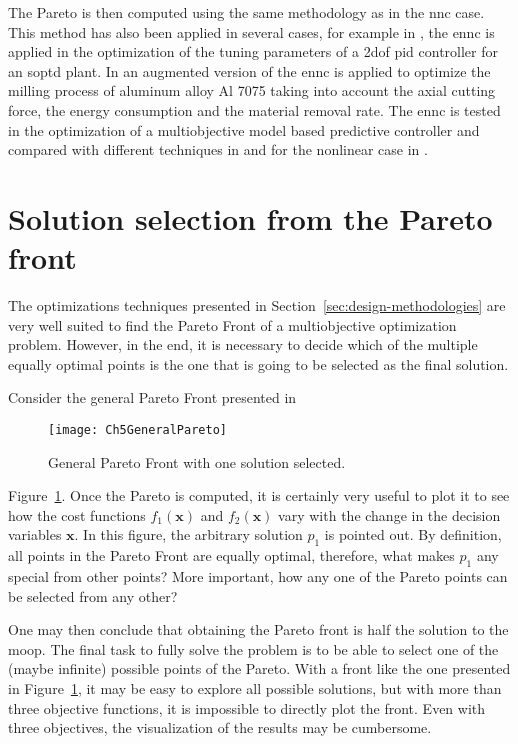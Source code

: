 The Pareto is then computed using the same methodology as in the \gls{nnc} case. This method has also been applied in several cases, for example in \citet{Contreras-Leiva2016}, the \gls{ennc} is applied in the optimization of the tuning parameters of a \gls{2dof} \gls{pid} controller for an \gls{soptd} plant. In \citet{Pereira2017b} an augmented version of the \gls{ennc} is applied to optimize the milling process of aluminum alloy Al 7075 taking into account the axial cutting force, the energy consumption and the material removal rate. The \gls{ennc} is tested in the optimization of a multiobjective model based predictive controller and compared with different techniques in \citet{Toro2011} and for the nonlinear case in \citet{Vallerio2014}.
\section{Solution selection from the Pareto front}
\label{sec:Selection}
The optimizations techniques presented in Section~\ref{sec:design-methodologies} are very well suited to find the Pareto Front of a multiobjective optimization problem. However, in the end, it is necessary to decide which of the multiple equally optimal points is the one that is going to be selected as the final solution.

Consider the general Pareto Front presented in 
\begin{figure}[b]
	\centering
	\texttt{[image: Ch5GeneralPareto]}
	\caption{General Pareto Front with one solution selected.}
	\label{fig:Ch5GeneralPareto}
\end{figure}
%
Figure~\ref{fig:Ch5GeneralPareto}. Once the Pareto is computed, it is certainly very useful to plot it to see how the cost functions $f_1(\mathbf{x})$ and $f_2(\mathbf{x})$ vary with the change in the decision variables $\mathbf{x}$. In this figure, the arbitrary solution $p_1$ is pointed out. By definition, all points in the Pareto Front are equally optimal, therefore, what makes $p_1$ any special from other points? More important, how any one of the Pareto points can be selected from any other?

One may then conclude that obtaining the Pareto front is half the solution to the \gls{moop}. The final task to fully solve the problem is to be able to select one of the (maybe infinite) possible points of the Pareto. With a front like the one presented in Figure~\ref{fig:Ch5GeneralPareto}, it may be easy to explore all possible solutions, but with more than three objective functions, it is impossible to directly plot the front. Even with three objectives, the visualization of the results may be cumbersome.

